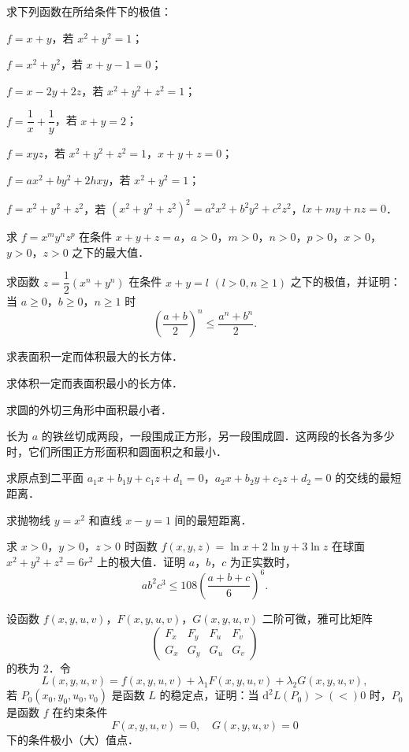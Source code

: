 \begin{xiti}
\item 求下列函数在所给条件下的极值：
\begin{ziti}
\item $f=x+y$，若 $x^{2}+y^{2}=1$；
\item $f=x^{2}+y^{2}$，若 $x+y-1=0$；
\item $f=x-2y+2z$，若 $x^{2}+y^{2}+z^{2}=1$；
\item $f=\dfrac{1}{x}+\dfrac{1}{y}$，若 $x+y=2$；
\item $f=xyz$，若 $x^{2}+y^{2}+z^{2}=1$，$x+y+z=0$；
\item $f=ax^{2}+by^{2}+2hxy$，若 $x^{2}+y^{2}=1$；
\item $f=x^{2}+y^{2}+z^{2}$，若 $(x^{2}+y^{2}+z^{2})^{2}=a^{2}x^{2}+b^{2}y^{2}+c^{2}z^{2}$，$lx+my+nz=0$．
\end{ziti}
\item 求 $f=x^{m}y^{n}z^{p}$ 在条件 $x+y+z=a$，$a>0$，$m>0$，$n>0$，$p>0$，$x>0$，$y>0$，$z>0$ 之下的最大值．
\item 求函数 $z=\dfrac{1}{2}(x^{n}+y^{n})$ 在条件 $x+y=l$ $(l>0,n\geqslant1)$ 之下的极值，并证明：当 $a\geqslant0$，$b\geqslant0$，$n\geqslant1$ 时
\[
\left(\frac{a+b}{2}\right)^{n}\leqslant\frac{a^{n}+b^{n}}{2}.
\]
\item 求表面积一定而体积最大的长方体．
\item 求体积一定而表面积最小的长方体．
\item 求圆的外切三角形中面积最小者．
\item 长为 $a$ 的铁丝切成两段，一段围成正方形，另一段围成圆．这两段的长各为多少时，它们所围正方形面积和圆面积之和最小．
\item 求原点到二平面 $a_{1}x+b_{1}y+c_{1}z+d_{1}=0$，$a_{2}x+b_{2}y+c_{2}z+d_{2}=0$ 的交线的最短距离．
\item 求抛物线 $y=x^{2}$ 和直线 $x-y=1$ 间的最短距离．
\item 求 $x>0$，$y>0$，$z>0$ 时函数 $f(x,y,z)=\ln x+2\ln y+3\ln z$ 在球面 $x^{2}+y^{2}+z^{2}=6r^{2}$ 上的极大值．证明 $a$，$b$，$c$ 为正实数时，
\[
ab^{2}c^{3}\leqslant108\left(\frac{a+b+c}{6}\right)^{6}.
\]
\item 设函数 $f(x,y,u,v)$，$F(x,y,u,v)$，$G(x,y,u,v)$ 二阶可微，雅可比矩阵
\[
\begin{pmatrix}F_{x}&F_{y}&F_{u}&F_{v}\\ G_{x}&G_{y}&G_{u}&G_{v}\end{pmatrix}
\]
的秩为 $2$．令
\[
L(x,y,u,v)=f(x,y,u,v)+\lambda_{1}F(x,y,u,v)+\lambda_{2}G(x,y,u,v),
\]
若 $P_{0}(x_{0},y_{0},u_{0},v_{0})$ 是函数 $L$ 的稳定点，证明：当 $\mathrm{d}^{2}L(P_{0})>(<)0$ 时，$P_{0}$ 是函数 $f$ 在约束条件
\[
F(x,y,u,v)=0,\quad G(x,y,u,v)=0
\]
下的条件极小（大）值点．
\end{xiti}
